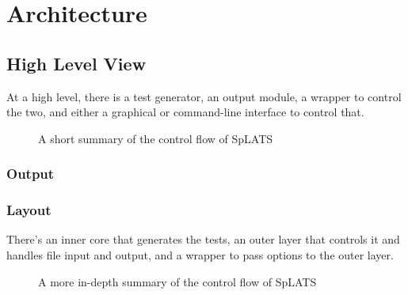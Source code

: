 \chapter{Architecture}

\section{High Level View}

  At a high level, there is a test generator, an output module, a wrapper to control the two, and either a graphical or command-line interface to control that.
\begin{center}
\begin{figure}
\caption{A short summary of the control flow of SpLATS}
\end{figure}
\end{center}

  \subsection{Output}

  \subsection{Layout}
    There's an inner core that generates the tests, an outer layer that controls it and handles file input and output, and a wrapper to pass options to the outer layer.

\begin{center}
\begin{figure}

\caption{A more in-depth summary of the control flow of SpLATS}
\end{figure}
\end{center}

